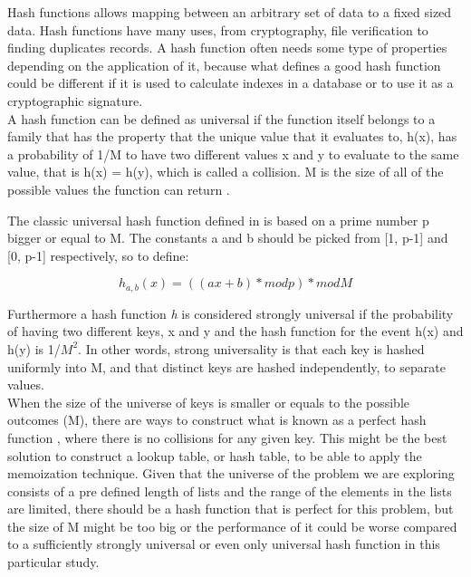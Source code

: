 \documentclass[a4paper,12pt]{article}
\begin{document}
Hash functions allows mapping between an arbitrary set of data to a fixed sized data. Hash functions have many uses, from cryptography, file verification to finding duplicates records. A hash function often needs some type of properties depending on the application of it, because what defines a good hash function could be different if it is used to calculate indexes in a database or to use it as a cryptographic signature. \\

A hash function can be defined as universal if the function itself belongs to a family that has the property that the unique value that it evaluates to, h(x), has a probability of 1/M to have two different values x and y to evaluate to the same value, that is h(x) = h(y), which is called a collision. M is the size of all of the possible values the function can return \cite{carter1979universal}.

The classic universal hash function defined in \cite{carter1979universal} is based on a prime number p bigger or equal to M. The constants a and b should be picked from  [1, p-1] and  [0, p-1] respectively, so to define:

\begin{equation}
    h_{a, b}(x) = ((ax + b)  * mod p) * mod M 
\end{equation}


Furthermore a hash function {\it h} is considered strongly universal if the probability of having two different keys, x and y and the hash function for the event h(x) and h(y) is 1/$M^{2}$. In other words, strong universality is that each key is hashed uniformly into M, and that distinct keys are hashed independently, to separate values.\\

When the size of the universe of keys is smaller or equals to the possible outcomes (M), there are ways to construct what is known as a perfect hash function  \cite{sprugnoli1977perfect}, where there is no collisions for any given key.  This might be the best solution to construct a lookup table, or hash table, to be able to apply the memoization technique. Given that the universe of the problem we are exploring consists of a pre defined length of lists and the range of the elements in the lists are limited, there should be a hash function that is perfect for this problem, but the size of M might be too big or the performance of it  could be worse compared to a sufficiently strongly universal or even only universal hash function in this particular study.
\end{document}
